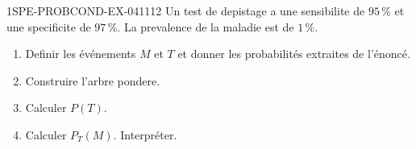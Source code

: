 \begin{exercice}{1SPE-PROBCOND-EX-041}{1}{12}
Un test de depistage a une sensibilite de $95\,\%$ et une specificite de $97\,\%$. La prevalence de la maladie est de $1\,\%$.

\begin{enumerate}
  \item Definir les événements $M$ et $T$ et donner les probabilités extraites de l'énoncé.
  \item Construire l'arbre pondere.
  \item Calculer $P(T)$.
  \item Calculer $P_T(M)$. Interpréter.
\end{enumerate}
\end{exercice}
